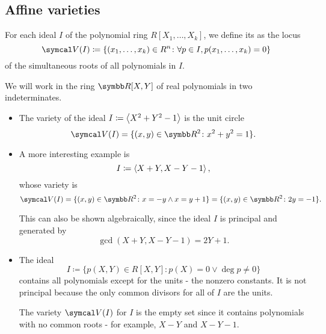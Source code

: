 \subsection{Affine varieties}\label{subsec:affine_varieties}

\begin{definition}\label{def:affine_variety}\cite[69]{Kocev2016}
  For each ideal \( I \) of the polynomial ring \( R[X_1, \ldots, X_k] \), we define its  as the locus
  \begin{equation*}
    \Cal{V}(I) \coloneqq \{ (x_1, \ldots, x_k) \in R^n \colon \forall p \in I, p(x_1, \ldots, x_k) = 0 \}
  \end{equation*}
  of the simultaneous roots of all polynomials in \( I \).
\end{definition}

\begin{example}\label{ex:affine_varieties}
  We will work in the ring \( \R[X, Y] \) of real polynomials in two indeterminates.

  \begin{itemize}
    \item The variety of the ideal \( I \coloneqq \left\langle X^2 + Y^2 - 1 \right\rangle \) is the unit circle
    \begin{equation*}
      \Cal{V}(I) = \{ (x, y) \in \R^2 \colon x^2 + y^2 = 1 \}.
    \end{equation*}

    \item A more interesting example is
    \begin{equation*}
      I \coloneqq \left\langle X + Y, X - Y - 1 \right\rangle,
    \end{equation*}
    whose variety is
    \begin{equation*}
      \Cal{V}(I) = \{ (x, y) \in \R^2 \colon x = -y \land x = y + 1 \} = \{ (x, y) \in \R^2 \colon 2y = -1 \}.
    \end{equation*}

    This can also be shown algebraically, since the ideal \( I \) is principal and generated by
    \begin{equation*}
      \gcd(X + Y, X - Y - 1) = 2Y + 1.
    \end{equation*}

    \item The ideal
    \begin{equation*}
      I \coloneqq \{ p(X, Y) \in R[X, Y] \colon p(X) = 0 \lor \deg p \neq 0 \}
    \end{equation*}
    contains all polynomials except for the units - the nonzero constants. It is not principal because the only common divisors for all of \( I \) are the units.

    The variety \( \Cal{V}(I) \) for \( I \) is the empty set since it contains polynomials with no common roots - for example, \( X - Y \) and \( X - Y - 1 \).
  \end{itemize}
\end{example}

